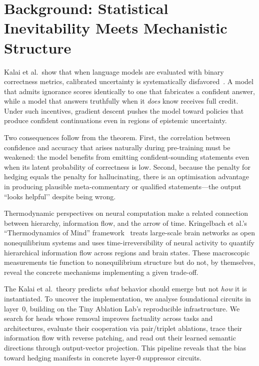 \section{Background: Statistical Inevitability Meets Mechanistic Structure}

Kalai et al.\ show that when language models are evaluated with binary correctness metrics, calibrated uncertainty is systematically disfavored~\cite{kalai2025why}.
A model that admits ignorance scores identically to one that fabricates a confident answer, while a model that answers truthfully when it \emph{does} know receives full credit.
Under such incentives, gradient descent pushes the model toward policies that produce confident continuations even in regions of epistemic uncertainty.

Two consequences follow from the theorem.
First, the correlation between confidence and accuracy that arises naturally during pre-training must be weakened: the model benefits from emitting confident-sounding statements even when its latent probability of correctness is low.
Second, because the penalty for hedging equals the penalty for hallucinating, there is an optimisation advantage in producing plausible meta-commentary or qualified statements—the output “looks helpful’’ despite being wrong.

Thermodynamic perspectives on neural computation make a related connection between hierarchy, information flow, and the arrow of time.
Kringelbach et al.'s ``Thermodynamics of Mind'' framework~\cite{kringelbach2024thermodynamics} treats large-scale brain networks as open nonequilibrium systems and uses time-irreversibility of neural activity to quantify hierarchical information flow across regions and brain states.
These macroscopic measurements tie function to nonequilibrium structure but do not, by themselves, reveal the concrete mechanisms implementing a given trade-off.

The Kalai et al.\ theory predicts \emph{what} behavior should emerge but not \emph{how} it is instantiated.
To uncover the implementation, we analyse foundational circuits in layer~0, building on the Tiny Ablation Lab’s reproducible infrastructure.
We search for heads whose removal improves factuality across tasks and architectures, evaluate their cooperation via pair/triplet ablations, trace their information flow with reverse patching, and read out their learned semantic directions through output-vector projection.
This pipeline reveals that the bias toward hedging manifests in concrete layer-0 suppressor circuits.
